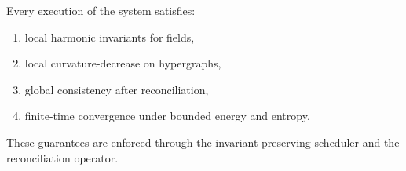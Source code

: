 Every execution of the system satisfies:

\begin{enumerate}
\item local harmonic invariants for fields,
\item local curvature-decrease on hypergraphs,
\item global consistency after reconciliation,
\item finite-time convergence under bounded energy and entropy.
\end{enumerate}

These guarantees are enforced through the invariant-preserving scheduler and the reconciliation operator.


